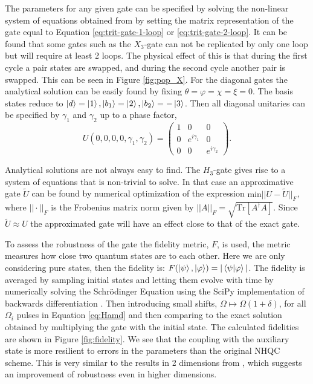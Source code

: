 The parameters for any given gate can be specified by solving the non-linear system of equations obtained from by setting the matrix representation of the gate equal to Equation \ref{eq:trit-gate-1-loop} or \ref{eq:trit-gate-2-loop}. It can be found that some gates such as the $X_3$-gate can not be replicated by only one loop but will require at least 2 loops. The physical effect of this is that during the first cycle a pair states are swapped, and during the second cycle another pair is swapped. This can be seen in Figure \ref{fig:pop_X}. For the diagonal gates the analytical solution can be easily found by fixing $\theta = \varphi = \chi = \xi = 0$. The basis states reduce to $\ket{d} = \ket{1}, \ket{b_1} = \ket{2}, \ket{b_2} = -\ket{3}$. Then all diagonal unitaries can be specified by $\gamma_1$ and $\gamma_2$ up to a phase factor,
\begin{equation}
U(0,0,0,0,\gamma_1,\gamma_2) = \begin{pmatrix}
1&0&0
\\
0&e^{i\gamma_1}&0
\\
0&0&e^{i\gamma_2}
\end{pmatrix}.
\end{equation}

Analytical solutions are not always easy to find. The $H_3$-gate gives rise to a system of equations that is non-trivial to solve. 
In that case an approximative gate $\tilde{U}$ can be found by numerical optimization of the expression $\text{min}||U-\tilde{U}||_F$, where $||\cdot||_F$ is the Frobenius matrix norm given by $||A||_F = \sqrt{\text{Tr}\left[A^\dagger A \right]}$. Since $\tilde{U} \approx U$ the approximated gate will have an effect close to that of the exact gate.

To assess the robustness of the gate the fidelity metric, $F$, is used, the metric measures how close two quantum states are to each other. Here we are only considering pure states, then the fidelity is: $F(\ket{\psi},\ket{\varphi}) = |\bra{\psi}\ket{\varphi}|$. The fidelity is averaged by sampling initial states and letting them evolve with time by numerically solving the Schrödinger Equation using the SciPy implementation of backwards differentiation \cite{BDF}. Then introducing small shifts, $\Omega \mapsto \Omega(1 + \delta)$, for all $\Omega_i$ pulses in Equation \ref{eq:Hamd} and then comparing to the exact solution obtained by multiplying the gate with the initial state. The calculated fidelities are shown in Figure \ref{fig:fidelity}. We see that the coupling with the auxiliary state is more resilient to errors in the parameters than the original NHQC scheme. This is very similar to the results in 2 dimensions from \cite{darkpath}, which suggests an improvement of robustness even in higher dimensions.

